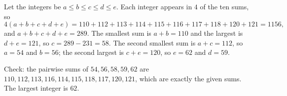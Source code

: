 Let the integers be $a\le b\le c\le d\le e$. Each integer appears in $4$ of the ten sums, so
\[
4(a+b+c+d+e)=110+112+113+114+115+116+117+118+120+121=1156,
\]
and $a+b+c+d+e=289$. The smallest sum is $a+b=110$ and the largest is $d+e=121$, so $c=289-231=58$. The second smallest sum is $a+c=112$, so $a=54$ and $b=56$; the second largest is $c+e=120$, so $e=62$ and $d=59$.

Check: the pairwise sums of $54,56,58,59,62$ are $110,112,113,116,114,115,118,117,120,121$, which are exactly the given sums. The largest integer is $\boxed{62}$.
